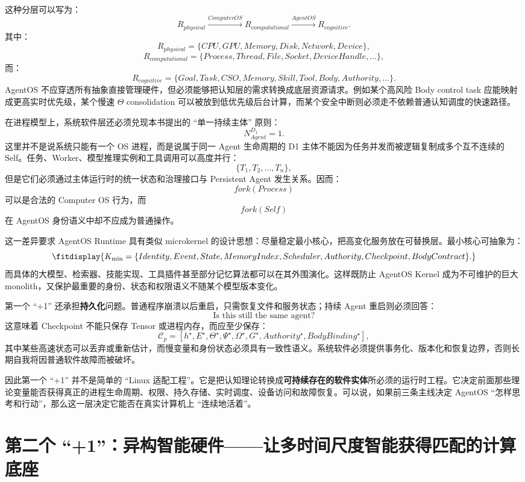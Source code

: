 这种分层可以写为：
\[
R_{physical}
\xrightarrow{ComputerOS}
R_{computational}
\xrightarrow{AgentOS}
R_{cognitive}.
\]
其中：
\[
R_{physical}
=
\{CPU,GPU,Memory,Disk,Network,Device\},
\]
\[
R_{computational}
=
\{Process,Thread,File,Socket,DeviceHandle,\ldots\},
\]
而：
\[
R_{cognitive}
=
\{Goal,Task,CSO,Memory,Skill,Tool,Body,Authority,\ldots\}.
\]
AgentOS 不应穿透所有抽象直接管理硬件，但必须能够把认知层的需求转换成底层资源请求。例如某个高风险 Body control task 应能映射成更高实时优先级，某个慢速 $\Theta$ consolidation 可以被放到低优先级后台计算，而某个安全中断则必须走不依赖普通认知调度的快速路径。

在进程模型上，系统软件层还必须兑现本书提出的 ``单一持续主体'' 原则：
\[
\boxed{
N_{Agent}^{D_1}=1.
}
\]
这里并不是说系统只能有一个 OS 进程，而是说属于同一 Agent 生命周期的 D1 主体不能因为任务并发而被逻辑复制成多个互不连续的 Self。任务、Worker、模型推理实例和工具调用可以高度并行：
\[
\{T_1,T_2,\ldots,T_n\},
\]
但是它们必须通过主体运行时的统一状态和治理接口与 Persistent Agent 发生关系。因而：
\[
fork(Process)
\]
可以是合法的 Computer OS 行为，而
\[
fork(Self)
\]
在 AgentOS 身份语义中却不应成为普通操作。

这一差异要求 AgentOS Runtime 具有类似 microkernel 的设计思想：尽量稳定最小核心，把高变化服务放在可替换层。最小核心可抽象为：
\[
\fitdisplay{
K_{\min}
=
\{
Identity,
Event,
State,
MemoryIndex,
Scheduler,
Authority,
Checkpoint,
BodyContract
\}.
}
\]
而具体的大模型、检索器、技能实现、工具插件甚至部分记忆算法都可以在其外围演化。这样既防止 AgentOS Kernel 成为不可维护的巨大 monolith，又保护最重要的身份、状态和权限语义不随某个模型版本变化。

第一个 ``+1'' 还承担\textbf{持久化}问题。普通程序崩溃以后重启，只需恢复文件和服务状态；持续 Agent 重启则必须回答：
\[
\text{Is this still the same agent?}
\]
这意味着 Checkpoint 不能只保存 Tensor 或进程内存，而应至少保存：
\[
\mathcal C_p
=
\left[
h^\star,
E^\star,
\Theta^\star,
\Psi^\star,
\Omega^\star,
G^\star,
Authority^\star,
BodyBinding^\star
\right],
\]
其中某些高速状态可以丢弃或重新估计，而慢变量和身份状态必须具有一致性语义。系统软件必须提供事务化、版本化和恢复边界，否则长期自我将因普通软件故障而被破坏。

因此第一个 ``+1'' 并不是简单的 ``Linux 适配工程''。它是把认知理论转换成\textbf{可持续存在的软件实体}所必须的运行时工程。它决定前面那些理论变量能否获得真正的进程生命周期、权限、持久存储、实时调度、设备访问和故障恢复。可以说，如果前三条主线决定 AgentOS ``怎样思考和行动''，那么这一层决定它能否在真实计算机上 ``连续地活着''。

\section{第二个 ``+1''：异构智能硬件——让多时间尺度智能获得匹配的计算底座}
\label{sec:roadmap-hardware}

